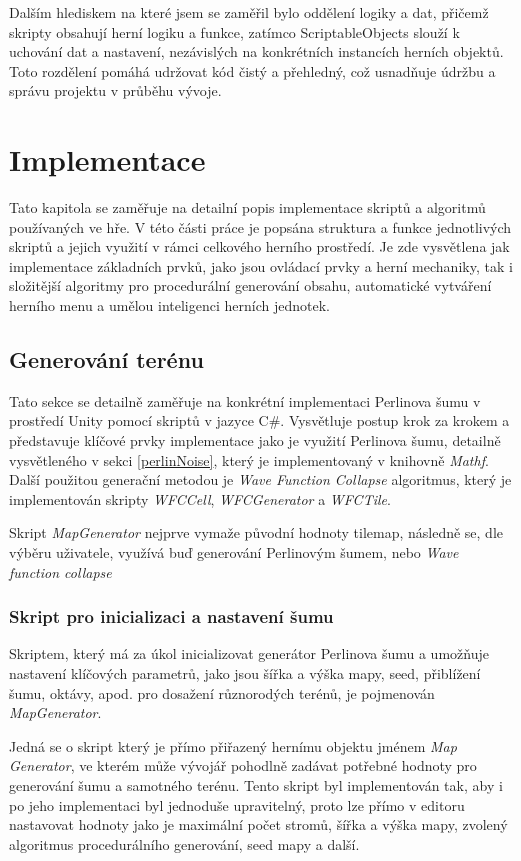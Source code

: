 Dalším hlediskem na které jsem se zaměřil bylo oddělení logiky a dat, přičemž skripty obsahují herní logiku a funkce, zatímco ScriptableObjects slouží k uchování dat a nastavení, nezávislých na konkrétních instancích herních objektů. Toto rozdělení pomáhá udržovat kód čistý a přehledný, což usnadňuje údržbu a správu projektu v průběhu vývoje.

\chapter{Implementace}
\label{implementace}
Tato kapitola se zaměřuje na detailní popis implementace skriptů a algoritmů používaných ve hře. V této části práce je popsána struktura a funkce jednotlivých skriptů a jejich využití v rámci celkového herního prostředí. Je zde vysvětlena jak implementace základních prvků, jako jsou ovládací prvky a herní mechaniky, tak i složitější algoritmy pro procedurální generování obsahu, automatické vytváření herního menu a umělou inteligenci herních jednotek.

\section{Generování terénu}
Tato sekce se detailně zaměřuje na konkrétní implementaci Perlinova šumu v prostředí Unity pomocí skriptů v jazyce C\#. Vysvětluje postup krok za krokem a představuje klíčové prvky implementace jako je využití Perlinova šumu, detailně vysvětleného v sekci \ref{perlinNoise}, který je implementovaný v knihovně \textit{Mathf}. Další použitou generační metodou je \textit{Wave Function Collapse} algoritmus, který je implementován skripty \textit{WFCCell}, \textit{WFCGenerator} a \textit{WFCTile}.

Skript \textit{MapGenerator} nejprve vymaže původní hodnoty tilemap, následně se, dle výběru uživatele, využívá buď generování Perlinovým šumem, nebo \textit{Wave function collapse}

\subsection{Skript pro inicializaci a nastavení šumu}
Skriptem, který má za úkol inicializovat generátor Perlinova šumu a umožňuje nastavení klíčových parametrů, jako jsou šířka a výška mapy, seed, přiblížení šumu, oktávy, apod. pro dosažení různorodých terénů, je pojmenován \textit{MapGenerator}. 

Jedná se o skript který je přímo přiřazený hernímu objektu jménem \textit{Map Generator}, ve kterém může vývojář pohodlně zadávat potřebné hodnoty pro generování šumu a samotného terénu. Tento skript byl implementován tak, aby i po jeho implementaci byl jednoduše upravitelný, proto lze přímo v editoru nastavovat hodnoty jako je maximální počet stromů, šířka a výška mapy, zvolený algoritmus procedurálního generování, seed mapy a další.

